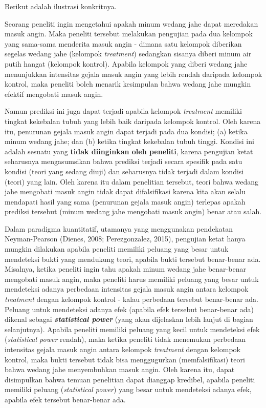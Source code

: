 \documentclass[
  english,
  man]{apa6}
\begin{document}
Berikut adalah ilustrasi konkritnya.

Seorang peneliti ingin mengetahui apakah minum wedang jahe dapat meredakan masuk angin. Maka peneliti tersebut melakukan pengujian pada dua kelompok yang sama-sama menderita masuk angin - dimana satu kelompok diberikan segelas wedang jahe (kelompok \emph{treatment}) sedangkan sisanya diberi minum air putih hangat (kelompok kontrol). Apabila kelompok yang diberi wedang jahe menunjukkan intensitas gejala masuk angin yang lebih rendah daripada kelompok kontrol, maka peneliti boleh menarik kesimpulan bahwa wedang jahe mungkin efektif mengobati masuk angin.

Namun prediksi ini juga dapat terjadi apabila kelompok \emph{treatment} memiliki tingkat kekebalan tubuh yang lebih baik daripada kelompok kontrol. Oleh karena itu, penurunan gejala masuk angin dapat terjadi pada dua kondisi; (a) ketika minum wedang jahe; dan (b) ketika tingkat kekebalan tubuh tinggi. Kondisi ini adalah sesuatu yang \textbf{tidak diinginkan oleh peneliti}, karena pengujian ketat seharusnya mengasumsikan bahwa prediksi terjadi secara spesifik pada satu kondisi (teori yang sedang diuji) dan seharusnya tidak terjadi dalam kondisi (teori) yang lain. Oleh karena itu dalam penelitian tersebut, teori bahwa wedang jahe mengobati masuk angin tidak dapat difalsifikasi karena kita akan selalu mendapati hasil yang sama (penurunan gejala masuk angin) terlepas apakah prediksi tersebut (minum wedang jahe mengobati masuk angin) benar atau salah.

Dalam paradigma kuantitatif, utamanya yang menggunakan pendekatan Neyman-Pearson (Dienes, 2008; Perezgonzalez, 2015), pengujian ketat hanya mungkin dilakukan apabila peneliti memiliki peluang yang besar untuk mendeteksi bukti yang mendukung teori, apabila bukti tersebut benar-benar ada. Misalnya, ketika peneliti ingin tahu apakah minum wedang jahe benar-benar mengobati masuk angin, maka peneliti harus memiliki peluang yang besar untuk mendeteksi adanya perbedaan intensitas gejala masuk angin antara kelompok \emph{treatment} dengan kelompok kontrol - kalau perbedaan tersebut benar-benar ada. Peluang untuk mendeteksi adanya efek (apabila efek tersebut benar-benar ada) dikenal sebagai \textbf{\emph{statistical power}} (yang akan dijelaskan lebih lanjut di bagian selanjutnya). Apabila peneliti memiliki peluang yang kecil untuk mendeteksi efek (\emph{statistical power} rendah), maka ketika peneliti tidak menemukan perbedaan intensitas gejala masuk angin antara kelompok \emph{treatment} dengan kelompok kontrol, maka bukti tersebut tidak bisa menggugurkan (memfalsifikasi) teori bahwa wedang jahe menyembuhkan masuk angin. Oleh karena itu, dapat disimpulkan bahwa temuan penelitian dapat dianggap kredibel, apabila peneliti memiliki peluang (\emph{statistical power}) yang besar untuk mendeteksi adanya efek, apabila efek tersebut benar-benar ada.
\end{document}
